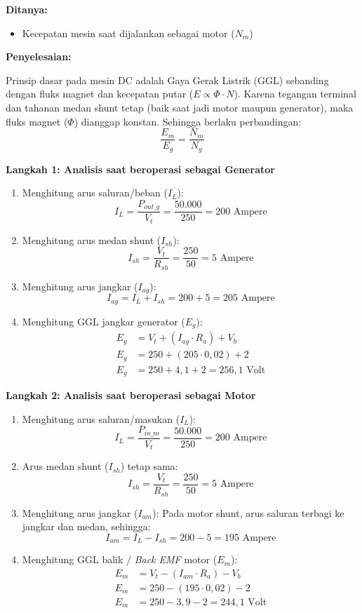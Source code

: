 \documentclass[12pt, a4paper]{article}
\begin{document}
\textbf{Ditanya:}
\begin{itemize}
    \item Kecepatan mesin saat dijalankan sebagai motor ($N_m$)
\end{itemize}

\textbf{Penyelesaian:}

Prinsip dasar pada mesin DC adalah Gaya Gerak Listrik (GGL) sebanding dengan fluks magnet dan kecepatan putar ($E \propto \Phi \cdot N$). Karena tegangan terminal dan tahanan medan shunt tetap (baik saat jadi motor maupun generator), maka fluks magnet ($\Phi$) dianggap konstan. Sehingga berlaku perbandingan:
\[
    \frac{E_m}{E_g} = \frac{N_m}{N_g}
\]

\textbf{Langkah 1: Analisis saat beroperasi sebagai Generator}
\begin{enumerate}
    \item Menghitung arus saluran/beban ($I_L$):
    \[
        I_L = \frac{P_{out\_g}}{V_t} = \frac{50.000}{250} = 200 \text{ Ampere}
    \]
    \item Menghitung arus medan shunt ($I_{sh}$):
    \[
        I_{sh} = \frac{V_t}{R_{sh}} = \frac{250}{50} = 5 \text{ Ampere}
    \]
    \item Menghitung arus jangkar ($I_{ag}$):
    \[
        I_{ag} = I_L + I_{sh} = 200 + 5 = 205 \text{ Ampere}
    \]
    \item Menghitung GGL jangkar generator ($E_g$):
    \begin{align*}
        E_g &= V_t + (I_{ag} \cdot R_a) + V_b \\
        E_g &= 250 + (205 \cdot 0,02) + 2 \\
        E_g &= 250 + 4,1 + 2 = 256,1 \text{ Volt}
    \end{align*}
\end{enumerate}

\textbf{Langkah 2: Analisis saat beroperasi sebagai Motor}
\begin{enumerate}
    \item Menghitung arus saluran/masukan ($I_L$):
    \[
        I_L = \frac{P_{in\_m}}{V_t} = \frac{50.000}{250} = 200 \text{ Ampere}
    \]
    \item Arus medan shunt ($I_{sh}$) tetap sama:
    \[
        I_{sh} = \frac{V_t}{R_{sh}} = \frac{250}{50} = 5 \text{ Ampere}
    \]
    \item Menghitung arus jangkar ($I_{am}$):
    Pada motor shunt, arus saluran terbagi ke jangkar dan medan, sehingga:
    \[
        I_{am} = I_L - I_{sh} = 200 - 5 = 195 \text{ Ampere}
    \]
    \item Menghitung GGL balik / \textit{Back EMF} motor ($E_m$):
    \begin{align*}
        E_m &= V_t - (I_{am} \cdot R_a) - V_b \\
        E_m &= 250 - (195 \cdot 0,02) - 2 \\
        E_m &= 250 - 3,9 - 2 = 244,1 \text{ Volt}
    \end{align*}
\end{enumerate}
\end{document}
